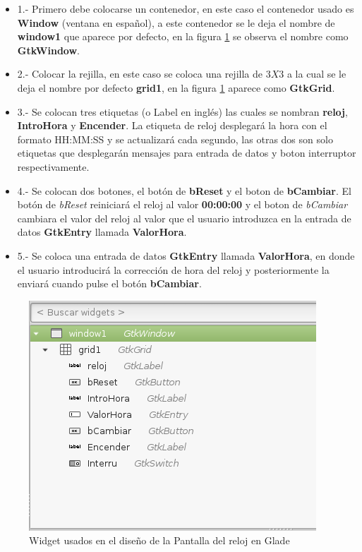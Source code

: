 \documentclass[12pt,twoside]{book}
\begin{document}
\begin{itemize}
\item 1.- Primero debe colocarse un contenedor, en este caso el contenedor usado es \textbf{Window} (ventana en español), a este contenedor se le deja el nombre de \textbf{window1} que aparece por defecto, en la figura \ref{fig0020} se observa el nombre como \textbf{GtkWindow}.
\item 2.- Colocar la rejilla, en este caso se coloca una rejilla de $3X3$ a la cual se le deja el nombre por defecto \textbf{grid1}, en la figura \ref{fig0020} aparece como \textbf{GtkGrid}.
\item 3.- Se colocan tres etiquetas (o Label en inglés) las cuales se nombran \textbf{reloj}, \textbf{IntroHora} y \textbf{Encender}. La etiqueta de reloj desplegará la hora con el formato HH:MM:SS y se actualizará cada segundo, las otras dos son solo etiquetas que desplegarán mensajes para entrada de datos y boton interruptor respectivamente.
\item 4.- Se colocan dos botones, el botón de \textbf{bReset} y el boton de \textbf{bCambiar}. El botón de \emph{bReset} reiniciará el reloj al valor \textbf{00:00:00} y el boton de \emph{bCambiar} cambiara el valor del reloj al valor que el usuario introduzca en la entrada de datos \textbf{GtkEntry} llamada \textbf{ValorHora}.
\item 5.- Se coloca una entrada de datos \textbf{GtkEntry} llamada \textbf{ValorHora}, en donde el usuario introducirá la corrección de hora del reloj y posteriormente la enviará cuando pulse el botón \textbf{bCambiar}.

\end{itemize}


\begin{figure}
	\centering
	\includegraphics[width=0.7\linewidth]{widgetReloj.png}
	\caption{Widget usados en el diseño de la Pantalla del reloj en Glade}
	\label{fig0020}
\end{figure}
\end{document}
